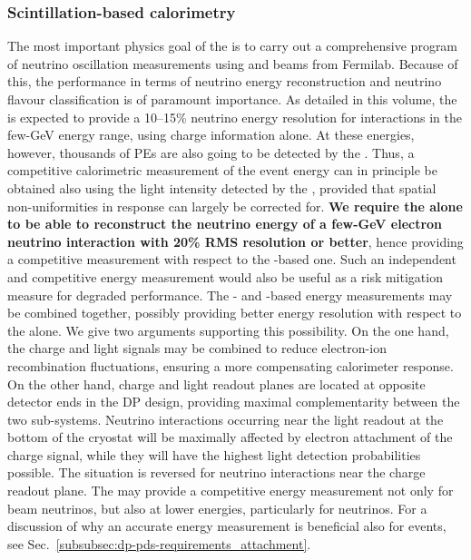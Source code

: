 \subsubsection{Scintillation-based calorimetry}

The most important physics goal of the \dune {} is to carry out a comprehensive program of neutrino oscillation measurements using \numu and \anumu beams from Fermilab. Because of this, the \dune {} performance in terms of neutrino energy reconstruction and neutrino flavour classification is of paramount importance. As detailed in this volume, the  is expected to provide a 10--15\% neutrino energy resolution for \nue {} interactions in the few-GeV energy range, using charge information alone. At these energies, however, thousands of PEs are also going to be detected by the . Thus, a competitive calorimetric measurement of the event energy can in principle be obtained also using the light intensity detected by the , provided that spatial non-uniformities in  response can largely be corrected for. {\bf We require the  alone to be able to reconstruct the neutrino energy of a few-GeV electron neutrino  interaction with 20\% RMS resolution or better}, hence providing a competitive measurement with respect to the -based one. Such an independent and competitive energy measurement would also be useful as a risk mitigation measure for degraded  performance. The - and -based energy measurements may be combined together, possibly providing better energy resolution with respect to the  alone. We give two arguments supporting this possibility. On the one hand, the charge and light signals may be combined to reduce electron-ion recombination fluctuations, ensuring a more compensating  calorimeter response. On the other hand, charge and light readout planes are located at opposite detector ends in the DP design, providing maximal complementarity between the two sub-systems. Neutrino interactions occurring near the light readout at the bottom of the cryostat will be maximally affected by electron attachment of the charge signal, while they will have the highest light detection probabilities possible. The situation is reversed for neutrino interactions near the charge readout plane. The  may provide a competitive energy measurement not only for beam neutrinos, but also at lower energies, particularly for  neutrinos. For a discussion of why an accurate energy measurement is beneficial also for  events, see Sec.~\ref{subsubsec:dp-pds-requirements_attachment}.


